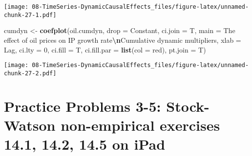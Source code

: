 \documentclass[
]{article}
\newenvironment{Shaded}{\begin{snugshade}}{\end{snugshade}}
\newcommand{\AttributeTok}[1]{\textcolor[rgb]{0.13,0.29,0.53}{#1}}
\newcommand{\DecValTok}[1]{\textcolor[rgb]{0.00,0.00,0.81}{#1}}
\newcommand{\FunctionTok}[1]{\textcolor[rgb]{0.13,0.29,0.53}{\textbf{#1}}}
\newcommand{\NormalTok}[1]{#1}
\newcommand{\OtherTok}[1]{\textcolor[rgb]{0.56,0.35,0.01}{#1}}
\newcommand{\SpecialCharTok}[1]{\textcolor[rgb]{0.81,0.36,0.00}{\textbf{#1}}}
\newcommand{\StringTok}[1]{\textcolor[rgb]{0.31,0.60,0.02}{#1}}
\begin{document}
\texttt{[image: 08-TimeSeries-DynamicCausalEffects\_files/figure-latex/unnamed-chunk-27-1.pdf]}

\begin{Shaded}
\begin{Highlighting}[]
\NormalTok{cumdyn }\OtherTok{\textless{}{-}} \FunctionTok{coefplot}\NormalTok{(oil.cumdyn, }\AttributeTok{drop =} \StringTok{\textquotesingle{}Constant\textquotesingle{}}\NormalTok{, }\AttributeTok{ci.join =}\NormalTok{ T,}
         \AttributeTok{main =} \StringTok{\textquotesingle{}The effect of oil prices on IP growth rate}\SpecialCharTok{\textbackslash{}n}\StringTok{Cumulative dynamic multipliers\textquotesingle{}}\NormalTok{,}
         \AttributeTok{xlab =} \StringTok{\textquotesingle{}Lag\textquotesingle{}}\NormalTok{,}
         \AttributeTok{ci.lty =} \DecValTok{0}\NormalTok{, }\AttributeTok{ci.fill =}\NormalTok{ T, }\AttributeTok{ci.fill.par =} \FunctionTok{list}\NormalTok{(}\AttributeTok{col =} \StringTok{\textquotesingle{}red\textquotesingle{}}\NormalTok{),}
         \AttributeTok{pt.join =}\NormalTok{ T)}
\end{Highlighting}
\end{Shaded}

\texttt{[image: 08-TimeSeries-DynamicCausalEffects\_files/figure-latex/unnamed-chunk-27-2.pdf]}

\hypertarget{practice-problems-3-5-stock-watson-non-empirical-exercises-14.1-14.2-14.5-on-ipad}{%
\section{Practice Problems 3-5: Stock-Watson non-empirical exercises
14.1, 14.2, 14.5 on
iPad}\label{practice-problems-3-5-stock-watson-non-empirical-exercises-14.1-14.2-14.5-on-ipad}}
\end{document}
